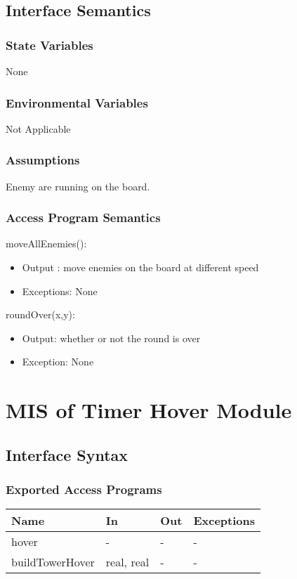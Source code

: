 \documentclass[12,english]{article}
\begin{document}
\subsection{Interface Semantics}
\subsubsection{State Variables}
None
\subsubsection{Environmental Variables}
Not Applicable
\subsubsection{Assumptions}
Enemy are running on the board. 
\subsubsection{Access Program Semantics}

\noindent moveAllEnemies():
\begin{itemize}
    \item Output : move enemies on the board at different speed
    \item Exceptions: None
\end{itemize}

\noindent roundOver(x,y):
\begin{itemize}
    \item Output: whether or not the round is over
    \item Exception: None
\end{itemize}

\newpage
\section{MIS of Timer Hover Module}
\subsection{Interface Syntax}
\subsubsection{Exported Access Programs}
\begin{table}[h!]
    \centering
    \begin{tabular}{|p{4cm}|p{2cm}|p{2cm}|p{2cm}|}
    \hline
    \textbf {Name}  & {In} & {Out} & {Exceptions} \\
    \hline
    hover & - & - & -\\
    \hline
    buildTowerHover& real, real & - & - \\
    \hline 
    \end{tabular}
\end{table}
\end{document}
